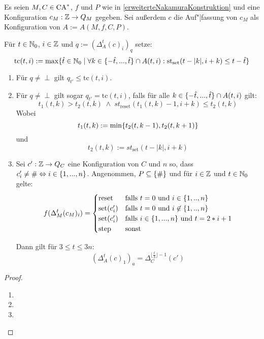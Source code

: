 \begin{satz}
    \label{timeNakamuraConstruction}
    Es seien $M, C \in \textrm{CA}^*$, $f$ und $P$ wie in \cref{erweiterteNakamuraKonstruktion} und eine Konfiguration $c_M: \mathbb{Z} \to Q_M$ gegeben.
    Sei außerdem $c$ die Auf"|fassung von $c_M$ als Konfiguration von $A := A(M, f, C, P)$.
    
    Für $t \in \mathbb{N}_0$, $i \in \mathbb{Z}$ und $q := (\Delta_{A}^t(c)_i)_q$ setze:
    \[
        \mathrm{tc}(t, i) := \max \{ { \hat{t} \in \mathbb{N}_0} \; | \; {
                \forall k \in \{ {-\hat{t}, ..., \hat{t} } \} \cap A(t, i):
                \mathrm{st}_{\mathrm{set}}(t-|k|, i+k) \leq t - \hat{t}
            } \}
    \]
    \begin{enumerate}
        \item
            Für $q \neq \perp$ gilt $q_{t'} \leq \mathrm{tc}(t, i)$.
        \item
            Für $q \neq \perp$ gilt sogar  $q_{t'} = \mathrm{tc}(t, i)$, falls für alle $k \in \{ {-\hat{t}, ..., \hat{t} } \} \cap A(t, i)$ gilt:
            \[
                t_1(t, k) > t_2(t, k)
                \; \land \;
                st_{\mathrm{reset}}(t_1(t, k) - 1, i + k) \leq t_2(t, k)
            \]
            Wobei
            \[
                t_1(t, k) := \min \{ { t_2(t, k - 1), t_2(t, k + 1) } \}
            \]
            und
            \[
                t_2(t, k) := st_{\mathrm{set}}(t - |k|, i + k)
            \]
        \item
            Sei $c': \mathbb{Z} \to Q_C$ eine Konfiguration von $C$ und $n$ so, dass $c'_i \neq \# \Leftrightarrow i \in \{ { 1, ..., n } \}$.
            Angenommen, $P \subseteq \{ { \# } \} $ und für $i \in \mathbb{Z}$ und $t \in \mathbb{N}_0$ gelte:
            \[
                f(\Delta_M^t(c_M)_i) =
                \begin{cases}
                    \mathrm{reset} & \text{falls } t = 0 \text{ und } i \in \{ {1, .., n} \} \\
                    \mathrm{set}(c'_i) & \text{falls } t = 0 \text{ und } i \not\in \{ {1, .., n} \} \\
                    \mathrm{set}(c'_i) & \text{falls } i \in \{ {1, ..., n} \} \text{ und } t = 2 * i + 1 \\
                    \mathrm{step} & \text{sonst}
                \end{cases}
            \]
            
            Dann gilt für $3 \leq t \leq 3n$:
            \[
                (\Delta^{t}_A(c)_1)_a = \Delta^{\lfloor \frac{t}{3} \rfloor - 1}_C(c')
            \]
     \end{enumerate}
\end{satz}
\begin{proof}
    \begin{enumerate}
        \item
        \item
        \item 
        
    \end{enumerate}
\end{proof}
